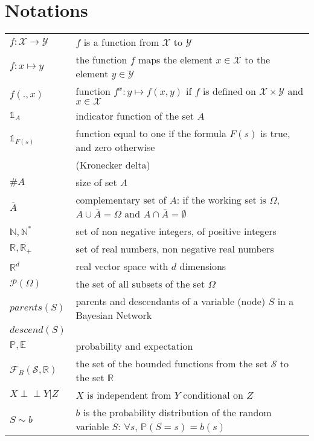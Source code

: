 \chapter*{Notations}

\pagestyle{plain}

\begin{supertabular}{ll}
  $f: \mathcal{X} \rightarrow \mathcal{Y}$ & $f$ is a function from $\mathcal{X}$ to $\mathcal{Y}$\\
  $f: x \mapsto y$ & the function $f$ maps the element $x\in\mathcal{X}$ to the element $y \in \mathcal{Y}$\\
  $f(.,x)$ & function $f^x: y \mapsto f(x,y)$ if $f$ is defined on $\mathcal{X} \times \mathcal{Y}$ and $x \in \mathcal{X}$\\
  $\mathds{1}_{A}$ & indicator function of the set $A$ \\
  $\mathds{1}_{F(s)}$ & function equal to one if the formula $F(s)$ is true, and zero otherwise\\
		&  (Kronecker delta)\\
  $\# A $ & size of set $A$ \\
  $\overline{A}$ & complementary set of $A$: if the working set is $\Omega$, $A \cup \overline{A} = \Omega$ and $A \cap \overline{A} = \emptyset$\\ 
  $\mathbb{N},\mathbb{N}^*$ & set of non negative integers, of positive integers\\
  $\mathbb{R},\mathbb{R}_+$ & set of real numbers, non negative real numbers \\ 
  $\mathbb{R}^d$   & real vector space with $d$ dimensions \\
  $\mathcal{P}(\Omega)$ & the set of all subsets of the set $\Omega$\\
  $parents(S)$ & parents and descendants of a variable (node) $S$ in a Bayesian Network\\
  $descend(S)$ & \\	
  $\mathbb{P},\mathbb{E}$ & probability and expectation \\
  $\mathcal{F}_{B}(\mathcal{S},\mathbb{R})$ & the set of the bounded functions from the set $\mathcal{S}$ to the set $\mathbb{R}$\\
  $X \perp\!\!\!\perp Y \vert Z$ & $X$ is independent from $Y$ conditional on $Z$\\
  $S \sim b$ & $b$ is the probability distribution of the random variable $S$: $\forall s$, 
$\mathbb{P}(S = s) = b(s)$\\

\end{supertabular}
